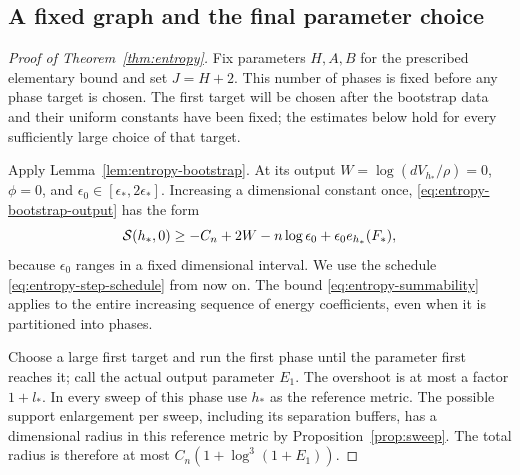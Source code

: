 \subsection{A fixed graph and the final parameter choice}

\begin{proof}[Proof of Theorem~\ref{thm:entropy}]
Fix parameters \(H,A,B\) for the prescribed elementary bound and set
\(J=H+2\).  This number of phases is fixed before any phase target
is chosen.  The first target will be chosen after the bootstrap data
and their uniform constants have been fixed; the estimates below
hold for every sufficiently large choice of that target.

Apply Lemma~\ref{lem:entropy-bootstrap}.  At its output
\(W=\log(dV_{h_*}/\rho)=0\), \(\phi=0\), and
\(\epsilon_0\in[\epsilon_*,2\epsilon_*]\).  Increasing a dimensional
constant once, \eqref{eq:entropy-bootstrap-output} has the form
\[
 \mathcal S(h_*,0)\geq-C_n+2W-n\log\epsilon_0
                    +\epsilon_0 e_{h_*}(F_*),
\]
because \(\epsilon_0\) ranges in a fixed dimensional interval.
We use the schedule \eqref{eq:entropy-step-schedule} from now on.
The bound \eqref{eq:entropy-summability} applies to the entire
increasing sequence of energy coefficients, even when it is
partitioned into phases.

Choose a large first target and run the first phase until the parameter
first reaches it; call the actual output parameter \(E_1\).  The
overshoot is at most a factor \(1+l_*\).  In every sweep of this phase
use \(h_*\) as the reference metric.  The possible support enlargement
per sweep, including its separation buffers, has a dimensional radius
in this reference metric by Proposition~\ref{prop:sweep}.  The total
radius is therefore at most \(C_n(1+\log^3(1+E_1))\).


\end{proof}
